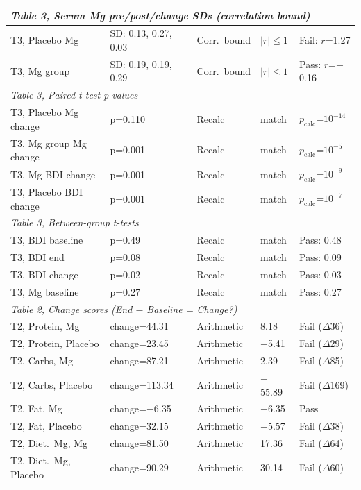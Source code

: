 \documentclass[11pt]{article}
\begin{document}
\begin{longtable}{p{3.5cm}p{2.2cm}p{1.8cm}p{2.5cm}p{2.5cm}}
\multicolumn{5}{l}{\textit{Table 3, Serum Mg pre/post/change SDs (correlation bound)}} \\
\midrule
T3, Placebo Mg & SD: 0.13, 0.27, 0.03 & Corr.\ bound & $|r| \leq 1$ & \textcolor{fail}{Fail: $r$=1.27} \\
T3, Mg group & SD: 0.19, 0.19, 0.29 & Corr.\ bound & $|r| \leq 1$ & \textcolor{pass}{Pass: $r$=$-$0.16} \\
\midrule

\multicolumn{5}{l}{\textit{Table 3, Paired t-test p-values}} \\
\midrule
T3, Placebo Mg change & p=0.110 & Recalc & match & \textcolor{flag}{$p_\text{calc}$=$10^{-14}$} \\
T3, Mg group Mg change & p=0.001 & Recalc & match & \textcolor{flag}{$p_\text{calc}$=$10^{-5}$} \\
T3, Mg BDI change & p=0.001 & Recalc & match & \textcolor{flag}{$p_\text{calc}$=$10^{-9}$} \\
T3, Placebo BDI change & p=0.001 & Recalc & match & \textcolor{flag}{$p_\text{calc}$=$10^{-7}$} \\
\midrule

\multicolumn{5}{l}{\textit{Table 3, Between-group t-tests}} \\
\midrule
T3, BDI baseline & p=0.49 & Recalc & match & \textcolor{pass}{Pass: 0.48} \\
T3, BDI end & p=0.08 & Recalc & match & \textcolor{pass}{Pass: 0.09} \\
T3, BDI change & p=0.02 & Recalc & match & \textcolor{pass}{Pass: 0.03} \\
T3, Mg baseline & p=0.27 & Recalc & match & \textcolor{pass}{Pass: 0.27} \\
\midrule

\multicolumn{5}{l}{\textit{Table 2, Change scores (End $-$ Baseline = Change?)}} \\
\midrule
T2, Protein, Mg & change=44.31 & Arithmetic & 8.18 & \textcolor{fail}{Fail ($\Delta$36)} \\
T2, Protein, Placebo & change=23.45 & Arithmetic & $-$5.41 & \textcolor{fail}{Fail ($\Delta$29)} \\
T2, Carbs, Mg & change=87.21 & Arithmetic & 2.39 & \textcolor{fail}{Fail ($\Delta$85)} \\
T2, Carbs, Placebo & change=113.34 & Arithmetic & $-$55.89 & \textcolor{fail}{Fail ($\Delta$169)} \\
T2, Fat, Mg & change=$-$6.35 & Arithmetic & $-$6.35 & \textcolor{pass}{Pass} \\
T2, Fat, Placebo & change=32.15 & Arithmetic & $-$5.57 & \textcolor{fail}{Fail ($\Delta$38)} \\
T2, Diet.\ Mg, Mg & change=81.50 & Arithmetic & 17.36 & \textcolor{fail}{Fail ($\Delta$64)} \\
T2, Diet.\ Mg, Placebo & change=90.29 & Arithmetic & 30.14 & \textcolor{fail}{Fail ($\Delta$60)} \\
\midrule


\end{longtable}
\end{document}
